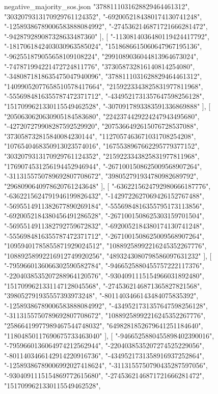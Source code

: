 \begin{filecontents*}[overwrite]{negative_majority_sos.json}
    "3788111031628829464461312",
    "3032079313170929761124352",
    "-6920052184380174130741248",
    "-12589386789006583888084992",
    "-2745362146871721666281472",
    "-942879289087328633487360"
   ],
   [
    "-1130814036480119424417792",
    "-1817061842403030963585024",
    "1518686615060647967195136",
    "-962551879055658109108224",
    "2991089036044813964673024",
    "-747871994221472724811776",
    "373058732816140814254080",
    "-3480871818635475047940096",
    "3788111031628829464461312",
    "14099052077658510578417664",
    "2159223343825831977811968",
    "-5556984816355787472371712",
    "-4349521731357647598256128",
    "1517099621330115549462528",
    "-3070917893383591336869888"
   ],
   [
    "2050630620630905184583680",
    "2242374429224247943495680",
    "-427207279908287592529920",
    "2075366492615076728537088",
    "373058732815840084230144",
    "1127057463671031708254208",
    "1076540468350913023574016",
    "1675538967662295779377152",
    "3032079313170929761124352",
    "2159223343825831977811968",
    "1769074531256194452946944",
    "-2671001508625009568907264",
    "-3113155750789692807708672",
    "398052791934780982689792",
    "2968090640978620761243648"
   ],
   [
    "-6362215624792980666187776",
    "-6362215624791946199826432",
    "-1429722627069426152767488",
    "-5695514911382677890269184",
    "-5556984816355795173113856",
    "-6920052184380456491286528",
    "-2671001508625303159701504",
    "-5695514911382792759672832",
    "-6920052184380174130741248",
    "-5556984816355787472371712",
    "-2671001508625009568907264",
    "10959401785855871929024512",
    "10889258992216245352267776",
    "10889258992216912749920256",
    "4893243080798586097631232"
   ],
   [
    "-7959660136066302590582784",
    "-9466525880455757222117376",
    "-2204038535207288964120576",
    "-9304091115154966031892480",
    "1517099621331147128045568",
    "-2745362146871365827821568",
    "398052791935557393973248",
    "-8011403466143484075835392",
    "-12589386789006583888084992",
    "-4349521731357647598256128",
    "-3113155750789692807708672",
    "10889258992216245352267776",
    "25866419977989467544748032",
    "6498281852679641251184640",
    "11804850117690675733463040"
   ],
   [
    "-9466525880455898402390016",
    "-7959660136064974212562944",
    "-2204038535207274525229056",
    "-8011403466142914220916736",
    "-4349521731358916937252864",
    "-12589386789006992027418624",
    "-3113155750790435287597056",
    "-9304091115154869772615680",
    "-2745362146871721666281472",
    "1517099621330115549462528",

\end{filecontents*}

